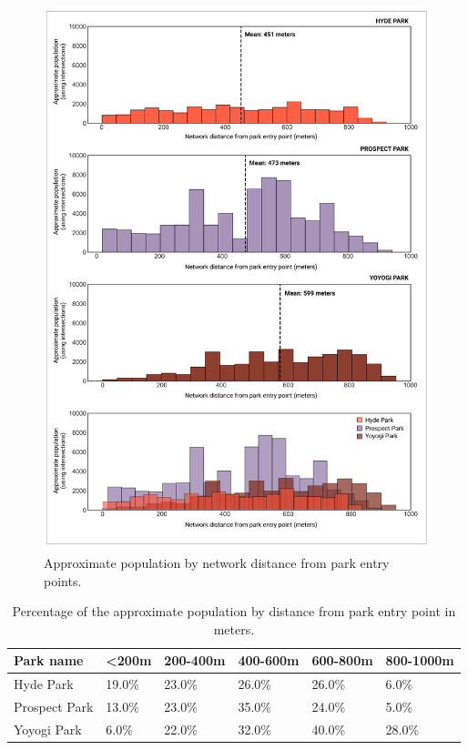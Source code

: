 \begin{figure}[H]
  \centering
  \vspace{8pt}
  \includegraphics[width=1.0\textwidth]{images/network/histograms.png}
  \captionsetup{width=1.0\linewidth}
  \caption[Histograms of distance by population]{Approximate population by network distance from park entry points.}
  \label{fig:histograms}
\end{figure}\par
\vfill

\begin{table}[H]
\centering
\small
\begin{tabular}{llllll}
\toprule
Park name & <200m & 200-400m & 400-600m & 600-800m & 800-1000m \\
\midrule
Hyde Park     &    19.0\% &      23.0\% &      26.0\% &      26.0\% &        6.0\% \\
Prospect Park &    13.0\% &      23.0\% &      35.0\% &      24.0\% &        5.0\% \\
Yoyogi Park   &     6.0\% &      22.0\% &      32.0\% &      40.0\% &       28.0\% \\
\bottomrule
\end{tabular}
\caption[Population and entry point distances]{Percentage of the approximate population by distance from park entry point in meters.}
\label{table:distance}
\end{table}

